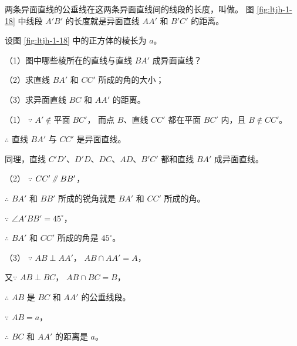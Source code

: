 两条异面直线的公垂线在这两条异面直线间的线段的长度，叫做。
图 \ref{fig:ltjh-1-18} 中线段 $A'B'$ 的长度就是异面直线 $AA'$ 和 $B'C'$ 的距离。

\liti[0] 设图 \ref{fig:ltjh-1-18} 中的正方体的棱长为 $a$。

（1）图中哪些棱所在的直线与直线 $BA'$ 成异面直线？

（2）求直线 $BA'$ 和 $CC'$ 所成的角的大小；

（3）求异面直线 $BC$ 和 $AA'$ 的距离。

\jie （1） $\because$ \quad $A' \not \in \text{平面}\;BC'$，
而点 $B$、直线 $CC'$ 都在平面 $BC'$ 内，且 $B \not \in CC'$。

$\therefore$ \quad 直线 $BA'$ 与 $CC'$ 是异面直线。

同理，直线 $C'D'$、$D'D$、$DC$、$AD$、$B'C'$ 都和直线 $BA'$ 成异面直线。

（2） $\because$ \quad $CC' \pingxing BB'$，

$\therefore$ \quad $BA'$ 和 $BB'$ 所成的锐角就是 $BA'$ 和 $CC'$ 所成的角。

$\because$ \quad $\angle A'BB' = 45^\circ$，

$\therefore$ \quad $BA'$ 和 $CC'$ 所成的角是 $45^\circ$。

（3） $\because$ \quad $AB \perp AA'$， $AB \cap AA' = A$，

又\quad $\because$ \quad $AB \perp BC$， $AB \cap BC = B$，

$\therefore$ \quad $AB$ 是 $BC$ 和 $AA'$ 的公垂线段。

$\because$ \quad $AB = a$，

$\therefore$ \quad $BC$ 和 $AA'$ 的距离是 $a$。


\begin{lianxi}

\xiaoti{}%
\begin{xiaoxiaotis}%


\end{xiaoxiaotis}



\end{lianxi}

